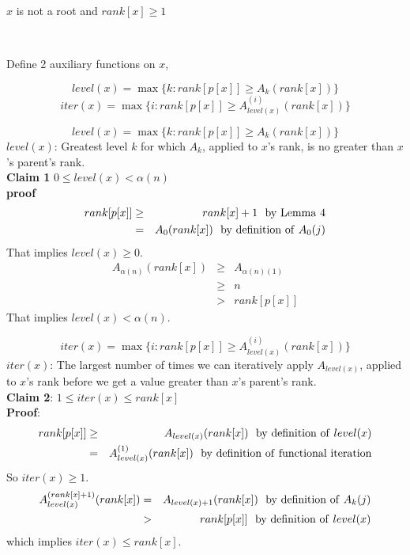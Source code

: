 \documentclass{beamer}
\begin{document}
\begin{frame}{}

\centerline{\large $x$ is not a root and $rank[x]\ge 1$}
\ \\
\centerline{Define 2 auxiliary functions on $x$,}
\begin{equation}level(x)=\max \{k:rank[p[x]]\ge A_k(rank[x])\}\end{equation}
\begin{equation}iter(x)=\max\{ i:rank[p[x]]\ge A_{level(x)}^{(i)}(rank[x])\}\end{equation}
\end{frame}

\begin{frame}{}

$$level(x)=\max \{k:rank[p[x]]\ge A_k(rank[x])\}$$
$level(x)$: Greatest level $k$ for which $A_k$, applied to $x$'s rank, is
 no greater than $x$'s parent's rank. \\
{\bf Claim 1} $0\le level(x)<\alpha(n)$\\
{\bf proof} 
\begin{eqnarray*}
rank[p[x]] &\ge& rank[x]+1 {\rm \ \ by\ Lemma\ 4}\\
  &=& A_0(rank[x]) {\rm \ \ by\ definition\ of\ }A_0(j)
\end{eqnarray*}
That implies $level(x)\ge 0$. 
\begin{eqnarray*}
A_{\alpha(n)}(rank[x]) &\ge& A_{\alpha(n)(1)} \\
 &\ge& n \\
 & > & rank[p[x]]
\end{eqnarray*}
That implies $level(x)<\alpha(n)$. 
\end{frame}

\begin{frame}{}

$$iter(x)=\max\{ i:rank[p[x]]\ge A_{level(x)}^{(i)}(rank[x])\}$$
$iter(x)$: The largest number of times we can iteratively apply $A_{level(x)}$,
 applied to $x$'s rank before we get a value greater than $x$'s
 parent's rank. \\
{\bf Claim 2}: $1\le iter(x)\le rank[x]$ \\
{\bf Proof}: 
\begin{eqnarray*}
rank[p[x]] &\ge& A_{level(x)}(rank[x]) {\rm\ \ by\ definition\ of\ }level(x)\\
 &=& A_{level(x)}^{(1)} (rank[x]) {\rm\ \ by\ definition\ of\ functional\ iteration}
\end{eqnarray*}
So $iter(x)\ge 1$. 
\begin{eqnarray*}
A_{level(x)}^{(rank[x]+1)}(rank[x]) &=& A_{level(x)+1}(rank[x]) {\rm\ \ by\ definition\ of\ }A_k(j)\\
 &>& rank[p[x]] {\rm\ \ by\ definition\ of\ } level(x)
\end{eqnarray*}
which implies $iter(x)\le rank[x]$. 
\end{frame}
\end{document}

